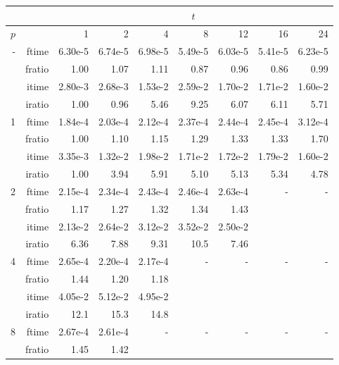 \documentclass[a4]{article}
\begin{document}
\begin{table}
\begin{center}
\begin{tabular}{|r|r|r|r|r|r|r|r|r|}
\hline 
     &  & \multicolumn{7}{c|}{$t$} \\ \hline
    $p$  &  & 1           & 2    & 4    & 8    & 12   & 16    & 24  \\ \hline\hline
    -  & ftime &   6.30e-5 &   6.74e-5 &   6.98e-5 &   5.49e-5 &   6.03e-5 &   5.41e-5 &   6.23e-5   \\ 
      & fratio &    1.00 &    1.07 &    1.11 &    0.87 &   0.96 &   0.86 &   0.99  \\ 
     & itime &    2.80e-3 &   2.68e-3 &   1.53e-2 &   2.59e-2 &   1.70e-2 &   1.71e-2 &   1.60e-2    \\ 
     & iratio &   1.00 &    0.96 &   5.46 &    9.25 &    6.07 &    6.11 &    5.71      \\ \hline \hline
    1  & ftime & 1.84e-4 &   2.03e-4 &   2.12e-4 &   2.37e-4 &   2.44e-4 &   2.45e-4 &   3.12e-4     \\ 
      & fratio &    1.00 &   1.10 &   1.15 &   1.29 &   1.33 &   1.33 &   1.70   \\ 
     & itime &    3.35e-3 &   1.32e-2 &   1.98e-2 &   1.71e-2 &   1.72e-2 &   1.79e-2 &   1.60e-2    \\ 
     & iratio &  1.00 &   3.94 &   5.91 &   5.10 &   5.13 &   5.34 &   4.78     \\ \hline
    2  & ftime &   2.15e-4 &   2.34e-4 &   2.43e-4 &   2.46e-4 &   2.63e-4 &    - & - \\ 
      & fratio &  1.17 &   1.27 &   1.32 &   1.34 &   1.43 &      &  \\
      & itime &   2.13e-2 &   2.64e-2 &   3.12e-2 &   3.52e-2 &   2.50e-2 &      &  \\
      & iratio &    6.36 &   7.88 &   9.31 &   10.5 &   7.46 &    &  \\ \hline
    4  & ftime &  2.65e-4 &   2.20e-4 &   2.17e-4 &    - & - & - & - \\ 
      & fratio &   1.44 &   1.20 &   1.18 &     &  &  &  \\
      & itime &    4.05e-2 &   5.12e-2 &   4.95e-2 &     & & & \\
      & iratio &     12.1 &   15.3 &   14.8 &   & & &  \\ \hline
    8  & ftime &    2.67e-4 &   2.61e-4 &     - & - & - & - & - \\ 
      & fratio &     1.45 &   1.42 &     &  &  &  &  \\

\end{tabular}
\end{center}
\end{table}
\end{document}
